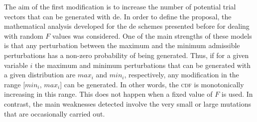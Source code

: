 \documentclass[preprint,3p]{elsarticle}
\newcommand{\DE}{{\sc de}}
\begin{document}
The aim of the first modification is to increase the number of potential trial vectors that can be generated
with \DE{}.
%
In order to define the proposal, the mathematical analysis developed for the \DE{}
schemes presented before for dealing with random $F$ values was considered.
%
One of the main strengths of these models is that any perturbation between the maximum and the minimum
admissible perturbations has a non-zero probability of being generated.
%
Thus, if for a given variable $i$ the maximum and minimum perturbations that can be generated with a given distribution
are $max_i$ and $min_i$, respectively, any modification in the range [$min_i$, $max_i$] can be generated.
%
In other words, the \textsc{cdf} is monotonically increasing in this range.
%
This does not happen when a fixed value of $F$ is used.
%
In contrast, the main weaknesses detected involve the very small or large mutations that
are occasionally carried out.
\end{document}
